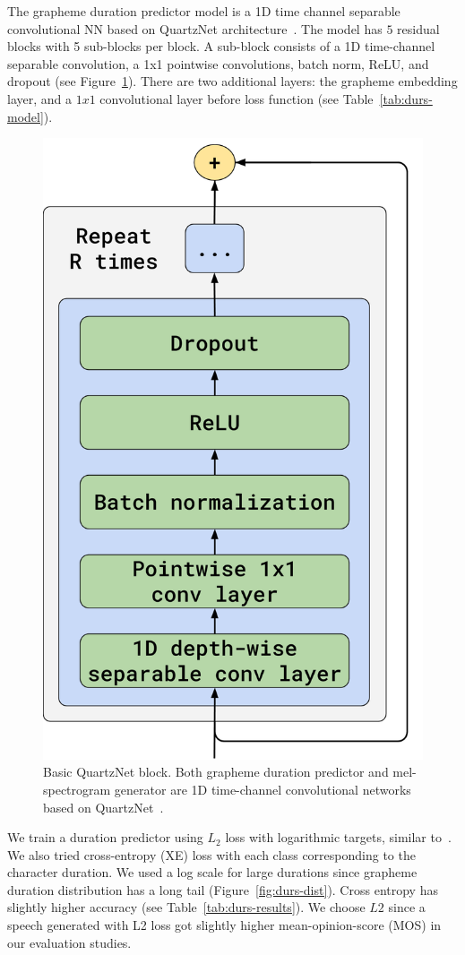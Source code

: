 The grapheme duration predictor model is a 1D time channel separable convolutional NN based on QuartzNet architecture~\cite{quartznet}. The model has $5$ residual blocks with 5 sub-blocks per block. A sub-block consists of a 1D time-channel separable convolution, a 1x1 pointwise convolutions, batch norm, ReLU, and dropout (see Figure~\ref{fig:qn-block}). There are two additional layers: the grapheme embedding layer, and a $1x1$ convolutional layer before loss function (see Table~\ref{tab:durs-model}).

\begin{figure}[!ht]
\centering
\includegraphics[width=0.8\linewidth]{images/qn-block.png}
\caption{Basic QuartzNet block. Both grapheme duration predictor and mel-spectrogram generator are 1D time-channel convolutional networks based on QuartzNet~\cite{quartznet}.}
\label{fig:qn-block}
\end{figure}

We train a duration predictor using $L_2$ loss with logarithmic targets, similar to~\cite{fastspeech}. We also tried cross-entropy (XE) loss with each class corresponding to the character duration. We used a log scale for large durations since grapheme duration distribution has a long tail (Figure~\ref{fig:durs-dist}). Cross entropy has slightly higher accuracy (see Table~\ref{tab:durs-results}). We choose $L2$ since a speech generated with L2 loss got slightly higher mean-opinion-score (MOS) in our evaluation studies.

